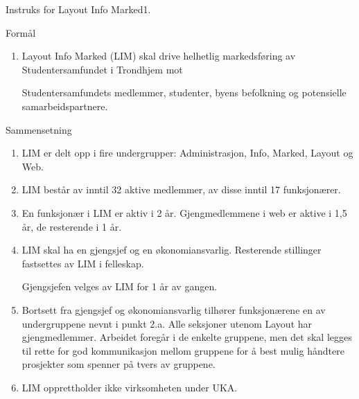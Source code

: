
\begin{instruks}{Instruks for Layout Info Marked}{1. }{ }

    \begin{instruksledd}{Formål}
        \begin{enumerate}
            \item Layout Info Marked (LIM) skal drive helhetlig markedsføring av Studentersamfundet
i Trondhjem mot
								
Studentersamfundets medlemmer, studenter, byens befolkning og potensielle samarbeidspartnere.
        \end{enumerate}
    \end{instruksledd}

    \begin{instruksledd}{Sammensetning}
        \begin{enumerate}
            \item LIM er delt opp i fire undergrupper: Administrasjon, Info, Marked, Layout og Web.
            \item LIM består av inntil 32 aktive medlemmer, av disse inntil 17 funksjonærer.
            \item En funksjonær i LIM er aktiv i 2 år. Gjengmedlemmene i web er aktive i 1,5 år, de
resterende i 1 år.
            \item LIM skal ha en gjengsjef og en økonomiansvarlig. Resterende stillinger fastsettes
av LIM i felleskap.
								
Gjengsjefen velges av LIM for 1 år av gangen.
						\item Bortsett fra gjengsjef og
økonomiansvarlig tilhører funksjonærene en av undergruppene nevnt i punkt 2.a.
									Alle
seksjoner utenom Layout har gjengmedlemmer. Arbeidet foregår i de enkelte gruppene, men det skal
									legges til
rette for god kommunikasjon mellom gruppene for å best mulig håndtere prosjekter som spenner på
									tvers av
gruppene.
						\item LIM opprettholder ikke
virksomheten under UKA.
        \end{enumerate}
     \end{instruksledd}


\end{instruks}
